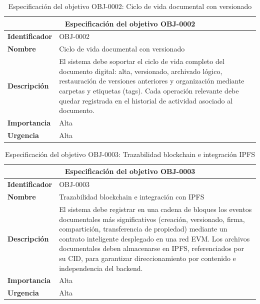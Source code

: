 \documentclass[11pt, a4paper]{article}
\begin{document}
\begin{table}[H]
    \centering
    \small
    \begin{tabular}{|p{4cm}|p{9cm}|}
    \hline
    \multicolumn{2}{|c|}{\textbf{Especificación del objetivo OBJ-0002}} \\
    \hline
    \textbf{Identificador} & OBJ-0002 \\
    \hline
    \textbf{Nombre} & Ciclo de vida documental con versionado \\
    \hline
    \textbf{Descripción} & El sistema debe soportar el ciclo de vida completo del documento digital: alta, versionado, archivado lógico, restauración de versiones anteriores y organización mediante carpetas y etiquetas (tags). Cada operación relevante debe quedar registrada en el historial de actividad asociado al documento. \\
    \hline
    \textbf{Importancia} & Alta \\
    \hline
    \textbf{Urgencia} & Alta \\
    \hline
    \end{tabular}
    \caption{Especificación del objetivo OBJ-0002: Ciclo de vida documental con versionado}
    \label{tab:obj-0002}
\end{table}

\begin{table}[H]
    \centering
    \small
    \begin{tabular}{|p{4cm}|p{9cm}|}
    \hline
    \multicolumn{2}{|c|}{\textbf{Especificación del objetivo OBJ-0003}} \\
    \hline
    \textbf{Identificador} & OBJ-0003 \\
    \hline
    \textbf{Nombre} & Trazabilidad blockchain e integración con IPFS \\
    \hline
    \textbf{Descripción} & El sistema debe registrar en una cadena de bloques los eventos documentales más significativos (creación, versionado, firma, compartición, transferencia de propiedad) mediante un contrato inteligente desplegado en una red EVM. Los archivos documentales deben almacenarse en IPFS, referenciados por su CID, para garantizar direccionamiento por contenido e independencia del backend. \\
    \hline
    \textbf{Importancia} & Alta \\
    \hline
    \textbf{Urgencia} & Alta \\
    \hline
    \end{tabular}
    \caption{Especificación del objetivo OBJ-0003: Trazabilidad blockchain e integración IPFS}
    \label{tab:obj-0003}
\end{table}
\end{document}
